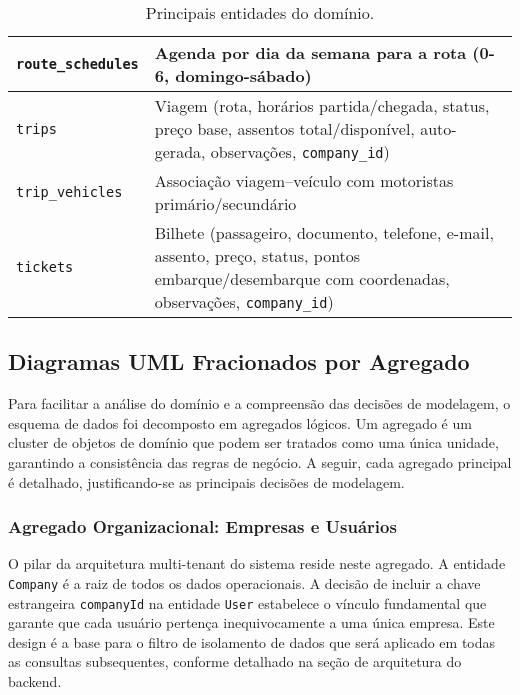 \begin{table}[H]
\begin{tabular}{|p{3.5cm}|p{11.5cm}|}
    \hline
    \texttt{route\_schedules} & Agenda por dia da semana para a rota (0-6, domingo-sábado)                                                                                                                                     \\
    \hline
    \texttt{trips}            & Viagem (rota, horários partida/chegada, status, preço base, assentos total/disponível, auto-gerada, observações, \texttt{company\_id})                                                         \\
    \hline
    \texttt{trip\_vehicles}   & Associação viagem--veículo com motoristas primário/secundário                                                                                                                                  \\
    \hline
    \texttt{tickets}          & Bilhete (passageiro, documento, telefone, e-mail, assento, preço, status, pontos embarque/desembarque com coordenadas, observações, \texttt{company\_id})                                      \\
    \hline
  \end{tabular}
  \caption{Principais entidades do domínio.}
  \label{tab:principais-entidades}
\end{table}

\subsection{Diagramas UML Fracionados por Agregado}

Para facilitar a análise do domínio e a compreensão das decisões de modelagem, o esquema de dados foi decomposto em agregados lógicos. Um agregado é um cluster de objetos de domínio que podem ser tratados como uma única unidade, garantindo a consistência das regras de negócio. A seguir, cada agregado principal é detalhado, justificando-se as principais decisões de modelagem.

\subsubsection*{Agregado Organizacional: Empresas e Usuários}

O pilar da arquitetura multi-tenant do sistema reside neste agregado. A entidade \texttt{Company} é a raiz de todos os dados operacionais. A decisão de incluir a chave estrangeira \texttt{companyId} na entidade \texttt{User} estabelece o vínculo fundamental que garante que cada usuário pertença inequivocamente a uma única empresa. Este design é a base para o filtro de isolamento de dados que será aplicado em todas as consultas subsequentes, conforme detalhado na seção de arquitetura do backend.

